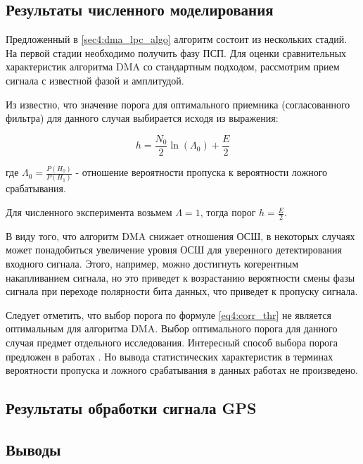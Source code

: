 \subsection{Результаты численного моделирования}
Предложенный в \ref{sec4:dma_lpc_algo} алгоритм состоит из нескольких стадий. На первой стадии необходимо получить фазу ПСП. Для
оценки сравнительных характеристик алгоритма DMA со стандартным подходом, рассмотрим прием сигнала с известной фазой и
амплитудой.

Из \cite{pestryakov-book} известно, что значение порога для оптимального приемника (согласованного фильтра) для данного случая выбирается
исходя из выражения:
\begin{center}
\begin{equation}
	\label{eq4:corr_thr}
	h = \frac{N_0}{2} \ln(\Lambda_0) + \frac{E}{2}
\end{equation}
\end{center}
где ${\Lambda_0=\frac{P(H_0)}{P(H_1)}}$ - отношение вероятности пропуска к вероятности ложного срабатывания.

Для численного эксперимента возьмем ${\Lambda=1}$, тогда порог ${h=\frac{E}{2}}$.

В виду того, что алгоритм DMA снижает отношения ОСШ, в некоторых случаях может понадобиться увеличение уровня ОСШ для
уверенного детектирования входного сигнала. Этого, например, можно достигнуть когерентным накапливанием сигнала, но
это приведет к возрастанию вероятности смены фазы сигнала при переходе полярности бита данных, что приведет к пропуску сигнала.

Следует отметить, что выбор порога по формуле \ref{eq4:corr_thr} не является оптимальным для алгоритма DMA. Выбор оптимального
порога для данного случая предмет отдельного исследования. Интересный способ выбора порога предложен в работах \cite{2max_article, 2max_ieee}.
Но вывода статистических характеристик в терминах вероятности пропуска и ложного срабатывания в данных работах не произведено.

\subsection{Результаты обработки сигнала GPS}

\subsection*{Выводы}

\newpage
